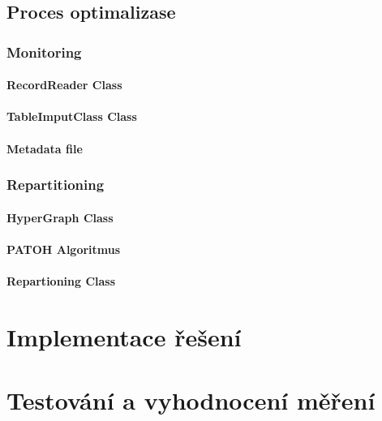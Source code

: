 \documentclass[thesis=M,czech]{FITthesis}[2012/06/26]
\begin{document}
\section{Proces optimalizase}
\subsection{Monitoring}

\subsubsection{RecordReader Class}
\subsubsection{TableImputClass Class}
\subsubsection{Metadata file}

\subsection{Repartitioning}
\subsubsection{HyperGraph Class}
\subsubsection{PATOH Algoritmus}
\subsubsection{Repartioning Class}

\chapter{Implementace řešení}

\chapter{Testování a vyhodnocení měření}



\begin{conclusion}
\end{conclusion}



\end{document}
